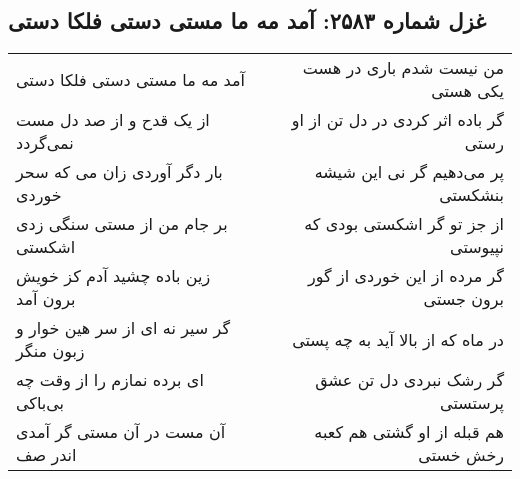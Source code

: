 \begin{center}
\section*{غزل شماره ۲۵۸۳: آمد مه ما مستی دستی فلکا دستی}
\label{sec:2583}
\begin{longtable}{l p{0.5cm} r}
آمد مه ما مستی دستی فلکا دستی
&&
من نیست شدم باری در هست یکی هستی
\\
از یک قدح و از صد دل مست نمی‌گردد
&&
گر باده اثر کردی در دل تن از او رستی
\\
بار دگر آوردی زان می که سحر خوردی
&&
پر می‌دهیم گر نی این شیشه بنشکستی
\\
بر جام من از مستی سنگی زدی اشکستی
&&
از جز تو گر اشکستی بودی که نپیوستی
\\
زین باده چشید آدم کز خویش برون آمد
&&
گر مرده از این خوردی از گور برون جستی
\\
گر سیر نه ای از سر هین خوار و زبون منگر
&&
در ماه که از بالا آید به چه پستی
\\
ای برده نمازم را از وقت چه بی‌باکی
&&
گر رشک نبردی دل تن عشق پرستستی
\\
آن مست در آن مستی گر آمدی اندر صف
&&
هم قبله از او گشتی هم کعبه رخش خستی
\\
\end{longtable}
\end{center}

